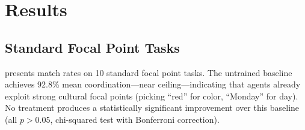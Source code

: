 \section{Results}
\label{sec:results}

\subsection{Standard Focal Point Tasks}
\label{sec:standard_focal}

 presents match rates on 10 standard focal point tasks.
The untrained baseline achieves 92.8\% mean coordination---near ceiling---indicating that \gptfour agents already exploit strong cultural focal points (\eg picking ``red'' for color, ``Monday'' for day).
No treatment produces a statistically significant improvement over this baseline (all $p > 0.05$, chi-squared test with Bonferroni correction).

\begin{table}[t]
\centering
\caption{Match rates (\%) on standard focal point tasks ($N{=}50$ pairs per condition). Baseline coordination is near-ceiling, leaving little room for improvement. Best result per task in \textbf{bold}.}
\label{tab:standard_focal}
\small
{}
\end{table}

